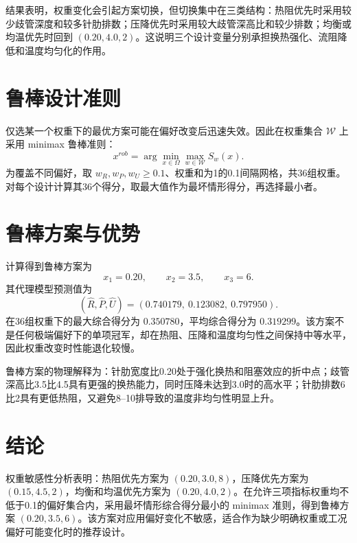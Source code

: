 \documentclass[UTF8,a4paper,12pt]{ctexart}
\begin{document}
结果表明，权重变化会引起方案切换，但切换集中在三类结构：热阻优先时采用较少歧管深度和较多针肋排数；压降优先时采用较大歧管深高比和较少排数；均衡或均温优先时回到 $(0.20,4.0,2)$。这说明三个设计变量分别承担换热强化、流阻降低和温度均匀化的作用。

\section{鲁棒设计准则}
仅选某一个权重下的最优方案可能在偏好改变后迅速失效。因此在权重集合 $\mathcal W$ 上采用 minimax 鲁棒准则：
\begin{equation}
x^{rob}=\arg\min_{x\in\Omega}\max_{w\in\mathcal W}S_w(x).
\end{equation}
为覆盖不同偏好，取 $w_R,w_P,w_U\ge0.1$、权重和为1的0.1间隔网格，共36组权重。对每个设计计算其36个得分，取最大值作为最坏情形得分，再选择最小者。

\section{鲁棒方案与优势}
计算得到鲁棒方案为
\begin{equation}
\boxed{x_1=0.20,\qquad x_2=3.5,\qquad x_3=6.}
\end{equation}
其代理模型预测值为
\[
(\hat R,\hat P,\hat U)=(0.740179,\ 0.123082,\ 0.797950).
\]
在36组权重下的最大综合得分为 $0.350780$，平均综合得分为 $0.319299$。该方案不是任何极端偏好下的单项冠军，却在热阻、压降和温度均匀性之间保持中等水平，因此权重改变时性能退化较慢。

鲁棒方案的物理解释为：针肋宽度比0.20处于强化换热和阻塞效应的折中点；歧管深高比3.5比4.5具有更强的换热能力，同时压降未达到3.0时的高水平；针肋排数6比2具有更低热阻，又避免8--10排导致的温度非均匀性明显上升。

\section{结论}
权重敏感性分析表明：热阻优先方案为 $(0.20,3.0,8)$，压降优先方案为 $(0.15,4.5,2)$，均衡和均温优先方案为 $(0.20,4.0,2)$。在允许三项指标权重均不低于0.1的偏好集合内，采用最坏情形综合得分最小的 minimax 准则，得到鲁棒方案 $(0.20,3.5,6)$。该方案对应用偏好变化不敏感，适合作为缺少明确权重或工况偏好可能变化时的推荐设计。
\end{document}

